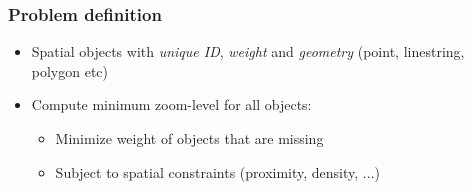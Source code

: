 \documentclass{beamer}
\begin{document}
\frame
{
  \frametitle{Problem definition}
  \begin{itemize}
  \item Spatial objects with \emph{unique ID}, \emph{weight} and \emph{geometry} (point, linestring, polygon etc)
  \item Compute minimum zoom-level for all objects:
  \begin{itemize}
  \item Minimize weight of objects that are missing
  \item Subject to spatial constraints (proximity, density, ...)
  \end{itemize}
  \end{itemize}
  \begin{center}
  \end{center}
}
\end{document}

